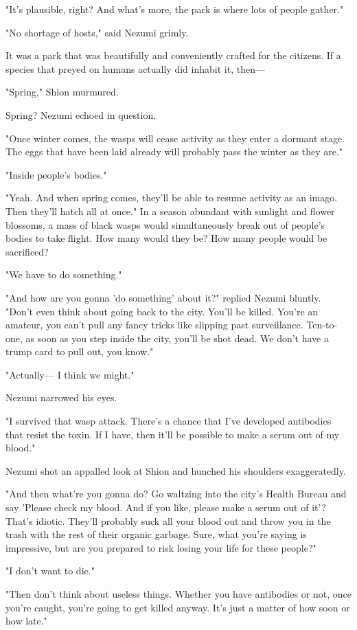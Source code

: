 "It's plausible, right? And what's more, the park is where lots of
people gather."

"No shortage of hosts," said Nezumi grimly.

It was a park that was beautifully and conveniently crafted for the
citizens. If a species that preyed on humans actually did inhabit it,
then---

"Spring," Shion murmured.

Spring? Nezumi echoed in question.

"Once winter comes, the wasps will cease activity as they enter a
dormant stage. The eggs that have been laid already will probably pass
the winter as they are."

"Inside people's bodies."

"Yeah. And when spring comes, they'll be able to resume activity as an
imago. Then they'll hatch all at once." In a season abundant with
sunlight and flower blossoms, a mass of black wasps would simultaneously
break out of people's bodies to take flight. How many would they be? How
many people would be sacrificed?

"We have to do something."

"And how are you gonna 'do something' about it?" replied Nezumi bluntly.
"Don't even think about going back to the city. You'll be killed. You're
an amateur, you can't pull any fancy tricks like slipping past
surveillance. Ten-to-one, as soon as you step inside the city, you'll be
shot dead. We don't have a trump card to pull out, you know."

"Actually--- I think we might."

Nezumi narrowed his eyes.

"I survived that wasp attack. There's a chance that I've developed
antibodies that resist the toxin. If I have, then it'll be possible to
make a serum out of my blood."

Nezumi shot an appalled look at Shion and hunched his shoulders
exaggeratedly.

"And then what're you gonna do? Go waltzing into the city's Health
Bureau and say 'Please check my blood. And if you like, please make a
serum out of it'? That's idiotic. They'll probably suck all your blood
out and throw you in the trash with the rest of their organic garbage.
Sure, what you're saying is impressive, but are you prepared to risk
losing your life for these people?"

"I don't want to die."

"Then don't think about useless things. Whether you have antibodies or
not, once you're caught, you're going to get killed anyway. It's just a
matter of how soon or how late."

